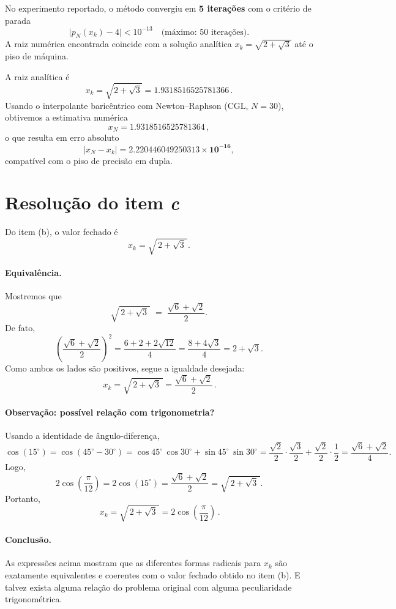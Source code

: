 \documentclass[11pt,a4paper]{article}
\begin{document}
No experimento reportado, o método convergiu em \textbf{5 iterações} com o critério de parada
\[
\lvert p_N(x_k)-4\rvert < 10^{-13} \quad \text{(máximo: 50 iterações).}
\]
A raiz numérica encontrada coincide com a solução analítica $x_k=\sqrt{2+\sqrt{3}}$ até o piso de máquina.

A raiz analítica é 
\[
x_k=\sqrt{2+\sqrt{3}}= \mathbf{1.9318516525781366}\,.
\]
Usando o interpolante baricêntrico com Newton--Raphson (CGL, $N=30$), obtivemos a estimativa numérica
\[
x_N=\mathbf{1.9318516525781364}\,,
\]
o que resulta em erro absoluto
\[
|x_N-x_k|=\mathbf{2.220446049250313\times 10^{-16}},
\]
compatível com o piso de precisão em dupla.

\section{Resolução do item \textit{c}}

Do item (b), o valor fechado é
\[
x_k=\sqrt{\,2+\sqrt{3}\,}.
\]

\paragraph{Equivalência.}
Mostremos que
\[
\sqrt{\,2+\sqrt{3}\,} \;=\; \frac{\sqrt{6}+\sqrt{2}}{2}.
\]
De fato,
\[
\left(\frac{\sqrt{6}+\sqrt{2}}{2}\right)^{\!2}
=\frac{6+2+2\sqrt{12}}{4}
=\frac{8+4\sqrt{3}}{4}
=2+\sqrt{3}.
\]
Como ambos os lados são positivos, segue a igualdade desejada:
\[
\boxed{\,x_k=\sqrt{\,2+\sqrt{3}\,}=\dfrac{\sqrt{6}+\sqrt{2}}{2}\,}.
\]
\paragraph{Observação: possível relação com trigonometria?}
Usando a identidade de ângulo-diferença,
\[
\cos(15^\circ)=\cos(45^\circ-30^\circ)
=\cos 45^\circ\,\cos 30^\circ+\sin 45^\circ\,\sin 30^\circ
=\frac{\sqrt{2}}{2}\cdot\frac{\sqrt{3}}{2}+\frac{\sqrt{2}}{2}\cdot\frac{1}{2}
=\frac{\sqrt{6}+\sqrt{2}}{4}.
\]
Logo,
\[
2\cos\!\left(\frac{\pi}{12}\right)=2\cos(15^\circ)
=\frac{\sqrt{6}+\sqrt{2}}{2}
=\sqrt{\,2+\sqrt{3}\,}.
\]
Portanto,
\[
\boxed{\,x_k=\sqrt{\,2+\sqrt{3}\,}=2\cos\!\left(\frac{\pi}{12}\right)\,}.
\]


\paragraph{Conclusão.}
As expressões acima mostram que as diferentes formas radicais para $x_k$ são exatamente equivalentes e coerentes com o valor fechado obtido no item (b). E talvez exista alguma relação do problema original com alguma peculiaridade trigonométrica.
\end{document}
